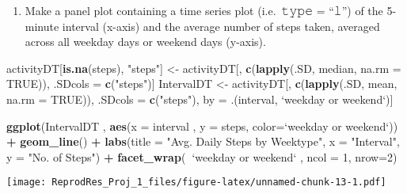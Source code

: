 \documentclass[
]{article}
\newenvironment{Shaded}{\begin{snugshade}}{\end{snugshade}}
\newcommand{\DataTypeTok}[1]{\textcolor[rgb]{0.13,0.29,0.53}{#1}}
\newcommand{\DecValTok}[1]{\textcolor[rgb]{0.00,0.00,0.81}{#1}}
\newcommand{\KeywordTok}[1]{\textcolor[rgb]{0.13,0.29,0.53}{\textbf{#1}}}
\newcommand{\NormalTok}[1]{#1}
\newcommand{\OperatorTok}[1]{\textcolor[rgb]{0.81,0.36,0.00}{\textbf{#1}}}
\newcommand{\OtherTok}[1]{\textcolor[rgb]{0.56,0.35,0.01}{#1}}
\newcommand{\StringTok}[1]{\textcolor[rgb]{0.31,0.60,0.02}{#1}}
\providecommand{\tightlist}{%
  \setlength{\itemsep}{0pt}\setlength{\parskip}{0pt}}
\begin{document}
\begin{enumerate}
\def\labelenumi{\arabic{enumi}.}
\setcounter{enumi}{1}
\tightlist
\item
  Make a panel plot containing a time series plot (i.e.~𝚝𝚢𝚙𝚎 = ``𝚕'') of
  the 5-minute interval (x-axis) and the average number of steps taken,
  averaged across all weekday days or weekend days (y-axis).
\end{enumerate}

\begin{Shaded}
\begin{Highlighting}[]
\NormalTok{activityDT[}\KeywordTok{is.na}\NormalTok{(steps), }\StringTok{"steps"}\NormalTok{] <-}\StringTok{ }\NormalTok{activityDT[, }\KeywordTok{c}\NormalTok{(}\KeywordTok{lapply}\NormalTok{(.SD, median, }\DataTypeTok{na.rm =} \OtherTok{TRUE}\NormalTok{)), .SDcols =}\StringTok{ }\KeywordTok{c}\NormalTok{(}\StringTok{"steps"}\NormalTok{)]}
\NormalTok{IntervalDT <-}\StringTok{ }\NormalTok{activityDT[, }\KeywordTok{c}\NormalTok{(}\KeywordTok{lapply}\NormalTok{(.SD, mean, }\DataTypeTok{na.rm =} \OtherTok{TRUE}\NormalTok{)), .SDcols =}\StringTok{ }\KeywordTok{c}\NormalTok{(}\StringTok{"steps"}\NormalTok{), by =}\StringTok{ }\NormalTok{.(interval, }\StringTok{`}\DataTypeTok{weekday or weekend}\StringTok{`}\NormalTok{)] }

\KeywordTok{ggplot}\NormalTok{(IntervalDT , }\KeywordTok{aes}\NormalTok{(}\DataTypeTok{x =}\NormalTok{ interval , }\DataTypeTok{y =}\NormalTok{ steps, }\DataTypeTok{color=}\StringTok{`}\DataTypeTok{weekday or weekend}\StringTok{`}\NormalTok{)) }\OperatorTok{+}\StringTok{ }\KeywordTok{geom_line}\NormalTok{() }\OperatorTok{+}\StringTok{ }\KeywordTok{labs}\NormalTok{(}\DataTypeTok{title =} \StringTok{"Avg. Daily Steps by Weektype"}\NormalTok{, }\DataTypeTok{x =} \StringTok{"Interval"}\NormalTok{, }\DataTypeTok{y =} \StringTok{"No. of Steps"}\NormalTok{) }\OperatorTok{+}\StringTok{ }\KeywordTok{facet_wrap}\NormalTok{(}\OperatorTok{~}\StringTok{`}\DataTypeTok{weekday or weekend}\StringTok{`}\NormalTok{ , }\DataTypeTok{ncol =} \DecValTok{1}\NormalTok{, }\DataTypeTok{nrow=}\DecValTok{2}\NormalTok{)}
\end{Highlighting}
\end{Shaded}

\texttt{[image: ReprodRes\_Proj\_1\_files/figure-latex/unnamed-chunk-13-1.pdf]}
\end{document}
